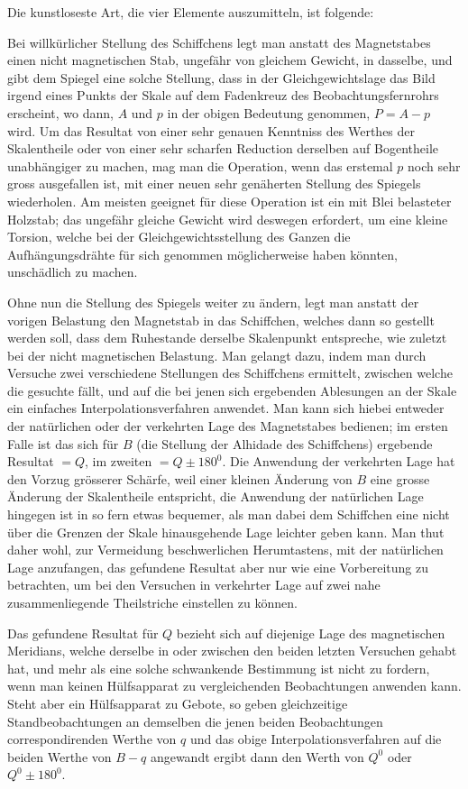 Die kunstloseste Art, die vier Elemente auszumitteln, ist folgende:

Bei willkürlicher Stellung des Schiffchens legt man anstatt des Magnetstabes einen nicht magnetischen Stab, ungefähr von gleichem Gewicht, in dasselbe, und gibt dem Spiegel eine solche Stellung, dass in der Gleichgewichtslage das Bild irgend eines Punkts der Skale auf dem Fadenkreuz des Beobachtungsfernrohrs erscheint, wo dann, $A$ und $p$ in der obigen Bedeutung genommen, $P=A-p$ wird. Um das Resultat von einer sehr genauen Kenntniss des Werthes der Skalentheile oder von einer sehr scharfen Reduction derselben auf Bogentheile unabhängiger zu machen, mag man die Operation, wenn das erstemal $p$ noch sehr gross ausgefallen ist, mit einer neuen sehr genäherten Stellung des Spiegels wiederholen. Am meisten geeignet für diese Operation ist ein mit Blei belasteter Holzstab; das ungefähr gleiche Gewicht wird deswegen erfordert, um eine kleine Torsion, welche bei der Gleichgewichtsstellung des Ganzen die Aufhängungsdrähte für sich genommen möglicherweise haben könnten, unschädlich zu machen.

Ohne nun die Stellung des Spiegels weiter zu ändern, legt man anstatt der vorigen Belastung den Magnetstab in das Schiffchen, welches dann so gestellt
werden soll, dass dem Ruhestande derselbe Skalenpunkt entspreche, wie zuletzt bei der nicht magnetischen Belastung. Man gelangt dazu, indem man durch Versuche zwei verschiedene Stellungen des Schiffchens ermittelt, zwischen welche die gesuchte fällt, und auf die bei jenen sich ergebenden Ablesungen an der Skale ein einfaches Interpolationsverfahren anwendet. Man kann sich hiebei entweder der natürlichen oder der verkehrten Lage des Magnetstabes bedienen; im ersten Falle ist das sich für $B$ (die Stellung der Alhidade des Schiffchens) ergebende Resultat $=Q$, im zweiten $=Q\pm180^0$. Die Anwendung der verkehrten Lage hat den Vorzug grösserer Schärfe, weil einer kleinen Änderung von $B$ eine grosse Änderung der Skalentheile entspricht, die Anwendung der natürlichen Lage hingegen ist in so fern etwas bequemer, als man dabei dem Schiffchen eine nicht über die Grenzen der Skale hinausgehende Lage leichter geben kann. Man thut daher wohl, zur Vermeidung beschwerlichen Herumtastens, mit der natürlichen Lage anzufangen, das gefundene Resultat aber nur wie eine Vorbereitung zu betrachten, um bei den Versuchen in verkehrter Lage auf zwei nahe zusammenliegende Theilstriche einstellen zu können.

Das gefundene Resultat für $Q$ bezieht sich auf diejenige Lage des magnetischen Meridians, welche derselbe in oder zwischen den beiden letzten Versuchen gehabt hat, und mehr als eine solche schwankende Bestimmung ist nicht zu fordern, wenn man keinen Hülfsapparat zu vergleichenden Beobachtungen anwenden kann. Steht aber ein Hülfsapparat zu Gebote, so geben gleichzeitige Standbeobachtungen an demselben die jenen beiden Beobachtungen correspondirenden Werthe von $q$ und das obige Interpolationsverfahren auf die beiden Werthe von $B-q$ angewandt ergibt dann den Werth von $Q^0$ oder $Q^0\pm180^0$.

